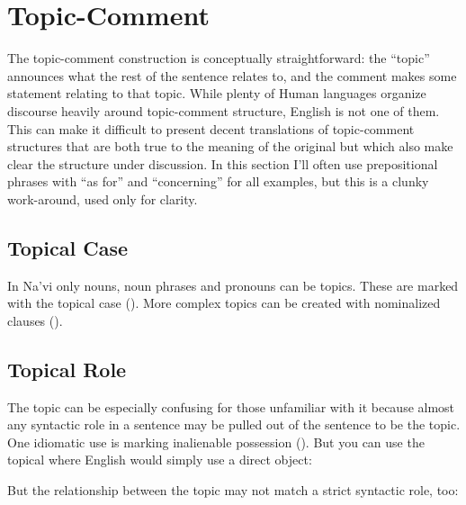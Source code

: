 

\section{Topic-Comment}
\label{pragma:topic-comment}

\noindent The topic-comment construction is conceptually
straightforward: the ``topic'' announces what the rest of the sentence
relates to, and the comment makes some statement relating to that
topic.  While plenty of Human languages organize discourse heavily
around topic-comment structure, English is not one of them.  This can
make it difficult to present decent translations of topic-comment
structures that are both true to the meaning of the original but which
also make clear the structure under discussion.  In this section I'll
often use prepositional phrases with ``as for'' and ``concerning'' for
all examples, but this is a clunky work-around, used only for clarity.

\subsection{Topical Case} In Na'vi only nouns, noun phrases and
pronouns can be topics.  These are marked with the topical case
().  More complex topics can be created with nominalized
clauses ().

\subsection{Topical Role} \label{pragma:topical-role}
The topic can be especially confusing for those unfamiliar with it
because almost any syntactic role in a sentence may be pulled out of
the sentence to be the topic.  One idiomatic use is marking
inalienable possession (). But you can use
the topical where English would simply use a direct object:

\begin{quotation}
\noindent{}

\medskip
\noindent{} 
\end{quotation}

\noindent But the relationship between the topic may not match a
strict syntactic role, too:

